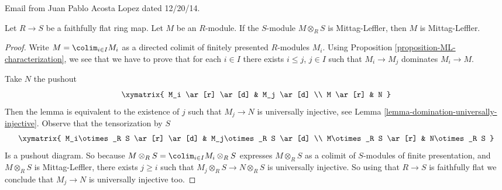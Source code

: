 \begin{lemma}
\label{lemma-ffdescent-ML}
\begin{reference}
Email from Juan Pablo Acosta Lopez dated 12/20/14.
\end{reference}
Let $R \to S$ be a faithfully flat ring map. Let $M$ be an $R$-module. If the
$S$-module $M \otimes_R S$ is Mittag-Leffler, then $M$ is Mittag-Leffler.
\end{lemma}

\begin{proof}
Write $M = \colim_{i\in I} M_i$ as a directed colimit
of finitely presented $R$-modules $M_i$.
Using Proposition \ref{proposition-ML-characterization}, we see that we
have to prove that for each $i \in I$ there exists $i \leq j$, $j\in I$
such that $M_i\rightarrow M_j$ dominates $M_i\rightarrow M$.

\medskip\noindent
Take $N$ the pushout
$$
\xymatrix{
M_i  \ar[r] \ar[d] & M_j \ar[d] \\
M \ar[r] & N
}
$$
Then the lemma is equivalent to the existence of $j$ such that
$M_j\rightarrow N$ is universally injective, see
Lemma \ref{lemma-domination-universally-injective}.
Observe that the tensorization by $S$
$$
\xymatrix{
M_i\otimes_R S  \ar[r] \ar[d] & M_j\otimes_R S \ar[d] \\
M\otimes_R S \ar[r] & N\otimes_R S
}
$$
Is a pushout diagram.  So because
$M \otimes_R S = \colim_{i\in I} M_i \otimes_R S$
expresses $M\otimes_R S$ as a colimit of $S$-modules of
finite presentation, and $M\otimes_R S$ is Mittag-Leffler,
there exists $j \geq i$ such that $M_j\otimes_R S\rightarrow N\otimes_R S$
is universally injective. So using that $R\rightarrow S$ is faithfully flat
we conclude that $M_j\rightarrow N$ is universally injective too.
\end{proof}
